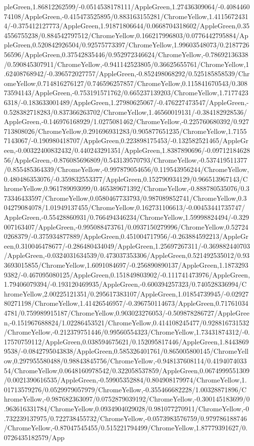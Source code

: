 {\begin{tikzternal}
pleGreen,1.86812262599/-0.0514538178111/AppleGreen,1.27436309064/-0.408446074108/AppleGreen,-0.415473525895/0.883163155281/ChromeYellow,1.41156724314/-0.375412127773/AppleGreen,1.91871806644/0.0668704318602/AppleGreen,0.354556755238/0.884542797512/ChromeYellow,0.166217996803/0.0776442795884/AppleGreen,0.520842926504/0.92575773397/ChromeYellow,1.99603548073/0.218772656596/AppleGreen,0.37542835446/0.952972346624/ChromeYellow,-0.78692136338/0.590845307911/ChromeYellow,-0.941142523805/0.36625655761/ChromeYellow,1.62408768942/-0.396572027757/AppleGreen,-0.852498068292/0.525185858539/ChromeYellow,0.714816276127/0.746596257857/ChromeYellow,0.115841670543/0.30873594143/AppleGreen,-0.753191571762/0.665237139203/ChromeYellow,1.71774236318/-0.183633001489/AppleGreen,1.27980625067/-0.476227473547/AppleGreen,-0.528382718283/0.837366263702/ChromeYellow,1.46560019131/-0.384182928536/AppleGreen,-0.146976168929/1.0275081462/ChromeYellow,-0.225760680392/0.927713808026/ChromeYellow,0.291696931283/0.905877651235/ChromeYellow,1.71557143067/-0.190980418707/AppleGreen,0.223898175453/-0.132582521465/AppleGreen,-0.00322400832432/0.440243291351/AppleGreen,1.8387890696/-0.0971218462856/AppleGreen,-0.876085696809/0.543139570793/ChromeYellow,-0.537419511377/0.855485364339/ChromeYellow,-0.997879054656/0.119543956244/ChromeYellow,0.480486353076/-0.359832553377/AppleGreen,0.152790934129/0.966513967143/ChromeYellow,0.961789093099/0.465389671392/ChromeYellow,-0.888780535076/0.373346433597/ChromeYellow,0.0580467733793/0.987089852741/ChromeYellow,0.304279084078/1.01949137455/ChromeYellow,0.162731106613/-0.00453441735747/AppleGreen,-0.55428860931/0.766494346234/ChromeYellow,1.59998824494/-0.329007163407/AppleGreen,-0.995088473761/0.0937150279996/ChromeYellow,0.527240268379/-0.375934877889/AppleGreen,0.451004717956/-0.263884592213/AppleGreen,0.310046478677/-0.286480434049/AppleGreen,1.25697267311/-0.369882440703/AppleGreen,-0.0324031634539/0.473037353306/AppleGreen,0.521492535012/0.933693015855/ChromeYellow,1.6091084697/-0.256890890137/AppleGreen,1.18732939382/-0.467095080125/AppleGreen,0.151849803902/-0.111741473976/AppleGreen,1.79406079394/-0.193120469935/AppleGreen,-0.600394257323/0.740528336994/ChromeYellow,2.00225121351/0.295617383107/AppleGreen,1.01854739945/-0.0292780271198/ChromeYellow,1.41426546957/-0.396750114673/AppleGreen,0.717610344781/0.759989915187/ChromeYellow,0.903023276053/-0.509878286727/AppleGreen,-0.151967688824/1.02286453521/ChromeYellow,0.414108245477/0.928816731532/ChromeYellow,-0.212379751446/0.99560554323/ChromeYellow,1.73431874312/-0.17570759112/AppleGreen,0.038594675621/0.152095817446/AppleGreen,1.84438699538/-0.0842795043838/AppleGreen,0.585326401761/0.865005800145/ChromeYellow,0.297955580488/0.98843845756/ChromeYellow,-0.948137608114/0.419407403354/ChromeYellow,0.0648160978542/0.322058537859/AppleGreen,0.0674999551309/0.0021390616535/AppleGreen,-0.59905352884/0.804908179974/ChromeYellow,1.01713579276/0.0529979057979/ChromeYellow,-0.355466682228/1.00328871896/ChromeYellow,-0.987682363097/0.0752879039192/ChromeYellow,-0.300145183699/0.963616331784/ChromeYellow,0.0934904029028/0.981077270911/ChromeYellow,-0.732239137975/0.722738455732/ChromeYellow,-0.0573983576759/0.979786188746/ChromeYellow,-0.87047545455/0.515221794499/ChromeYellow,1.87779391627/0.0726435182579/App
\end{tikzternal}}
